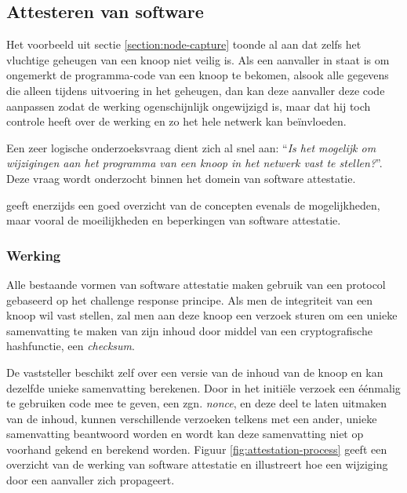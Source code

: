 \subsection{Attesteren van software}
\label{subsection:attestation}

Het voorbeeld uit sectie \ref{section:node-capture} toonde al aan dat zelfs het
vluchtige geheugen van een knoop niet veilig is. Als een aanvaller in staat is
om ongemerkt de programma-code van een knoop te bekomen, alsook alle gegevens
die alleen tijdens uitvoering in het geheugen, dan kan deze aanvaller deze code
aanpassen zodat de werking ogenschijnlijk ongewijzigd is, maar dat hij toch
controle heeft over de werking en zo het hele netwerk kan be\"invloeden.

Een zeer logische onderzoeksvraag dient zich al snel aan: ``\emph{Is het
mogelijk om wijzigingen aan het programma van een knoop in het netwerk vast te
stellen?}''. Deze vraag wordt onderzocht binnen het domein van software
attestatie.

\cite{castelluccia2009difficulty} geeft enerzijds een goed overzicht van de
concepten evenals de mogelijkheden, maar vooral de moeilijkheden en beperkingen
van software attestatie.

\subsubsection*{Werking}

Alle bestaande vormen van software attestatie maken gebruik van een protocol
gebaseerd op het challenge response principe. Als men de integriteit van een
knoop wil vast stellen, zal men aan deze knoop een verzoek sturen om een unieke
samenvatting te maken van zijn inhoud door middel van een cryptografische
hashfunctie, een \emph{checksum}.

De vaststeller beschikt zelf over een versie van de inhoud van de knoop en kan
dezelfde unieke samenvatting berekenen. Door in het initi\"ele verzoek een
\'e\'enmalig te gebruiken code mee te geven, een zgn. \emph{nonce}, en deze
deel te laten uitmaken van de inhoud, kunnen verschillende verzoeken telkens
met een ander, unieke samenvatting beantwoord worden en wordt kan deze
samenvatting niet op voorhand gekend en berekend worden. Figuur
\ref{fig:attestation-process} geeft een overzicht van de werking van software
attestatie en illustreert hoe een wijziging door een aanvaller zich propageert.

